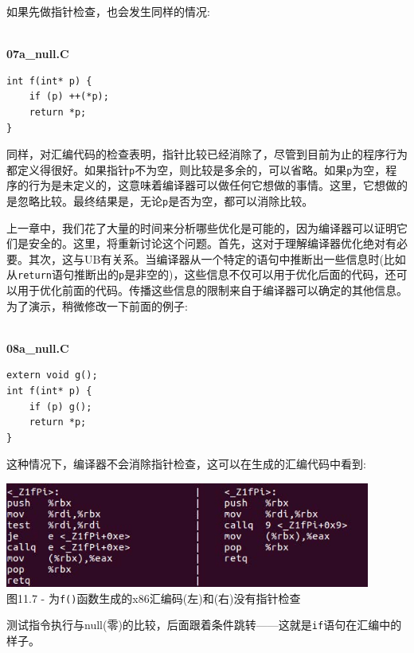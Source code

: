 如果先做指针检查，也会发生同样的情况:

\hspace*{\fill} \\ %
\noindent
\textbf{07a\_null.C}
\begin{lstlisting}[style=styleCXX]
int f(int* p) {
	if (p) ++(*p);
	return *p;
}
\end{lstlisting}

同样，对汇编代码的检查表明，指针比较已经消除了，尽管到目前为止的程序行为都定义得很好。如果指针\texttt{p}不为空，则比较是多余的，可以省略。如果\texttt{p}为空，程序的行为是未定义的，这意味着编译器可以做任何它想做的事情。这里，它想做的是忽略比较。最终结果是，无论\texttt{p}是否为空，都可以消除比较。

上一章中，我们花了大量的时间来分析哪些优化是可能的，因为编译器可以证明它们是安全的。这里，将重新讨论这个问题。首先，这对于理解编译器优化绝对有必要。其次，这与UB有关系。当编译器从一个特定的语句中推断出一些信息时(比如从\texttt{return}语句推断出的\texttt{p}是非空的)，这些信息不仅可以用于优化后面的代码，还可以用于优化前面的代码。传播这些信息的限制来自于编译器可以确定的其他信息。为了演示，稍微修改一下前面的例子:

\hspace*{\fill} \\ %
\noindent
\textbf{08a\_null.C}
\begin{lstlisting}[style=styleCXX]
extern void g();
int f(int* p) {
	if (p) g();
	return *p;
}
\end{lstlisting}

这种情况下，编译器不会消除指针检查，这可以在生成的汇编代码中看到:

\begin{center}
\includegraphics[width=0.9\textwidth]{content/3/chapter11/images/7.jpg}\\
图11.7 - 为\texttt{f()}函数生成的x86汇编码(左)和(右)没有指针检查
\end{center}

测试指令执行与null(零)的比较，后面跟着条件跳转——这就是\texttt{if}语句在汇编中的样子。 

